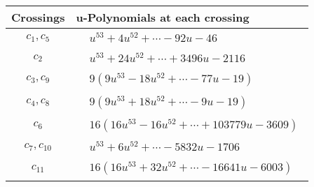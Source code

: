 \documentclass[1p]{elsarticle_modified}
\theoremstyle{definition}
\begin{document}
\begin{tabular}{m{50pt}|m{274pt}}
Crossings & \hspace{64pt}u-Polynomials at each crossing \\
\hline $$\begin{aligned}c_{1},c_{5}\end{aligned}$$&$\begin{aligned}
&u^{53}+4 u^{52}+\cdots-92 u-46
\end{aligned}$\\
\hline $$\begin{aligned}c_{2}\end{aligned}$$&$\begin{aligned}
&u^{53}+24 u^{52}+\cdots+3496 u-2116
\end{aligned}$\\
\hline $$\begin{aligned}c_{3},c_{9}\end{aligned}$$&$\begin{aligned}
&9(9 u^{53}-18 u^{52}+\cdots-77 u-19)
\end{aligned}$\\
\hline $$\begin{aligned}c_{4},c_{8}\end{aligned}$$&$\begin{aligned}
&9(9 u^{53}+18 u^{52}+\cdots-9 u-19)
\end{aligned}$\\
\hline $$\begin{aligned}c_{6}\end{aligned}$$&$\begin{aligned}
&16(16 u^{53}-16 u^{52}+\cdots+103779 u-3609)
\end{aligned}$\\
\hline $$\begin{aligned}c_{7},c_{10}\end{aligned}$$&$\begin{aligned}
&u^{53}+6 u^{52}+\cdots-5832 u-1706
\end{aligned}$\\
\hline $$\begin{aligned}c_{11}\end{aligned}$$&$\begin{aligned}
&16(16 u^{53}+32 u^{52}+\cdots-16641 u-6003)
\end{aligned}$\\
\hline
\end{tabular}\\~\\
\end{document}
